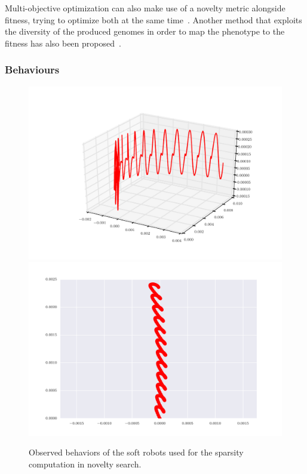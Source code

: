 \documentclass{sig-alternate}
\begin{document}
Multi-objective optimization can also make use of a novelty metric alongside fitness, trying to optimize both at the same time~\cite{mouret2011novelty}. Another method that exploits the diversity of the produced genomes in order to map the phenotype to the fitness has also been proposed~\cite{mouret2012algorithm}.

\subsubsection{Behaviours}

\begin{figure}[h]
\centering
\includegraphics[scale=0.19]{../Figures/Behaviors/3d.pdf}\includegraphics[scale=0.18]{../Figures/Behaviors/2d.pdf}
\caption{Observed behaviors of the soft robots used for the sparsity computation in novelty search.}
\label{fig:Behaviors}
\end{figure}
\end{document}

